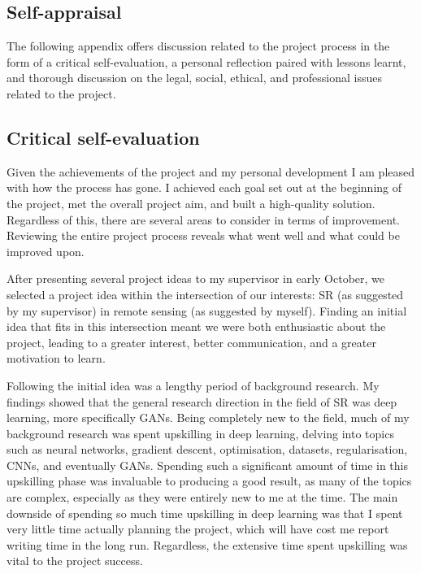 \begin{appendices}
\chapter{Self-appraisal}
The following appendix offers discussion related to the project process in the form of a critical self-evaluation, a personal reflection paired with lessons learnt, and thorough discussion on the legal, social, ethical, and professional issues related to the project.

\section{Critical self-evaluation}
Given the achievements of the project and my personal development I am pleased with how the process has gone. I achieved each goal set out at the beginning of the project, met the overall project aim, and built a high-quality solution. Regardless of this, there are several areas to consider in terms of improvement. Reviewing the entire project process reveals what went well and what could be improved upon.

After presenting several project ideas to my supervisor in early October, we selected a project idea within the intersection of our interests: SR (as suggested by my supervisor) in remote sensing (as suggested by myself). Finding an initial idea that fits in this intersection meant we were both enthusiastic about the project, leading to a greater interest, better communication, and a greater motivation to learn. 

Following the initial idea was a lengthy period of background research. My findings showed that the general research direction in the field of SR was deep learning, more specifically GANs. Being completely new to the field, much of my background research was spent upskilling in deep learning, delving into topics such as neural networks, gradient descent, optimisation, datasets, regularisation, CNNs, and eventually GANs. Spending such a significant amount of time in this upskilling phase was invaluable to producing a good result, as many of the topics are complex, especially as they were entirely new to me at the time. The main downside of spending so much time upskilling in deep learning was that I spent very little time actually planning the project, which will have cost me report writing time in the long run. Regardless, the extensive time spent upskilling was vital to the project success.


\end{appendices}
